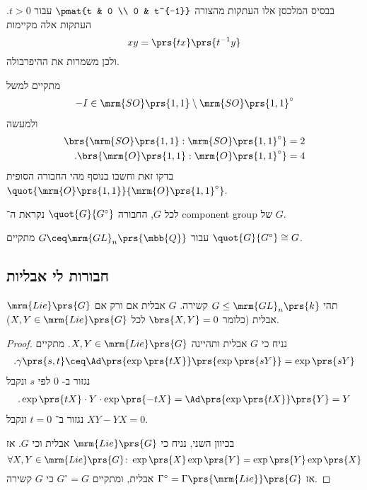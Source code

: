 \documentclass[10pt, twoside]{book}
\newcommand{\textenglish}[1]{\foreignlanguage{english}{#1}}
\begin{document}
\begin{example}
בבסיס המלכסן אלו העתקות מהצורה
$\pmat{t & 0 \\ 0 & t^{-1}}$
עבור
$t > 0$.
העתקות אלה מקיימות
\[xy = \prs{tx}\prs{t^{-1}y}\]
ולכן משמרות את ההיפרבולה.

מתקיים למשל
\begin{align*}
-I \in \mrm{SO}\prs{1,1} \setminus \mrm{SO}\prs{1,1}^\circ
\end{align*}
ולמעשה
\begin{align*}
\brs{\mrm{SO}\prs{1,1} : \mrm{SO}\prs{1,1}^\circ} &= 2 \\
\text{.}\brs{\mrm{O}\prs{1,1} : \mrm{O}\prs{1,1}^\circ} &= 4
\end{align*}
בדקו זאת וחשבו בנוסף מהי החבורה הסופית
$\quot{\mrm{O}\prs{1,1}}{\mrm{O}\prs{1,1}^\circ}$.
\end{example}

\begin{definition}
לכל
$G$,
החבורה
$\quot{G}{G^\circ}$
נקראת ה־%
\textenglish{component group}
של
$G$.
\end{definition}

\begin{example}
עבור
$G \ceq \mrm{GL}_n\prs{\mbb{Q}}$
מתקיים
$\quot{G}{G^\circ} \cong G$.
\end{example}

\subsection{חבורות לי אבליות}

\begin{proposition}
תהי
$G \leq \mrm{GL}_n\prs{k}$
קשירה.
$G$
אבלית אם ורק אם
$\mrm{Lie}\prs{G}$
אבלית (כלומר
$\brs{X,Y} = 0$
לכל
$X,Y \in \mrm{Lie}\prs{G}$).
\end{proposition}

\begin{proof}
נניח כי
$G$
אבלית ותהיינה
$X,Y \in \mrm{Lie}\prs{G}$.
מתקיים
\begin{align*}
\text{.} \gamma\prs{s,t} \ceq \Ad\prs{\exp\prs{tX}} \prs{\exp\prs{sY}} = \exp\prs{sY}
\end{align*}
נגזור ב-%
$0$
לפי
$s$
ונקבל
\begin{align*}
\text{.} \exp\prs{tX} \cdot Y \cdot \exp\prs{-tX} = \Ad\prs{\exp\prs{tX}}\prs{Y} = Y
\end{align*}
נגזור ב־%
$t = 0$
ונקבל
$XY - YX = 0$.

בכיוון השני, נניח כי
$\mrm{Lie}\prs{G}$
אבלית וכי
$G$.
אז
\[\forall X,Y \in \mrm{Lie}\prs{G} \colon \exp\prs{X} \exp\prs{Y} = \exp\prs{Y}\exp\prs{X}\]
אז
$\Gamma^\circ =\Gamma\prs{\mrm{Lie}}\prs{G}$
אבלית, ומתקיים
$G^\circ = G$
כי
$G$
קשירה.
\end{proof}
\end{document}
